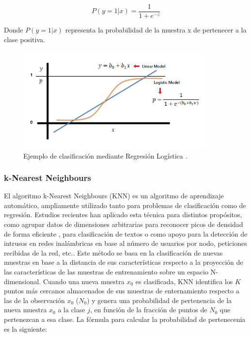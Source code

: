 \documentclass{uathesis-es}
\begin{document}
\[
    P(y = 1 | x) = \frac{1}{1 + e^{-z}}
\]

Donde $P(y = 1 | x)$ representa la probabilidad de la muestra x de pertenecer a la clase positiva.


\begin{figure}[H]
    \centering
    \includegraphics[width=10cm]{Figures/Background/LogReg_1.png}
    \caption{Ejemplo de clasificación mediante Regresión Logística \cite{LR}.}
    \label{GA_inicializacion}
\end{figure}


\subsubsection*{k-Nearest Neighbours}

El algoritmo k-Nearest Neighbours (KNN) es un algoritmo de aprendizaje automático, ampliamente utilizado tanto para problemas de clasificación como de regresión. Estudios recientes han aplicado esta técnica para distintos propósitos, como agrupar datos de dimensiones arbitrarias para reconocer picos de densidad de forma eficiente \cite{chen2020fast}, para clasificación de textos \cite{CHEN2020523} o como apoyo para la detección de intrusos en redes inalámbricas \cite{liu2022enhanced} en base al número de usuarios por nodo, peticiones recibidas de la red, etc.. Este método se basa en la clasificación de nuevas muestras en base a la distancia de sus características respecto a la proyección de las características de las muestras de entrenamiento sobre un espacio N-dimensional. Cuando una nueva muestra $x_0$ es clasificada, KNN identifica los $K$ puntos más cercanos almacenados de sus muestras de enternamiento respecto a las de la observación $x_0$ ($N_0$) y genera una probabilidad de pertenencia de la nueva muestra $x_0$ a la clase $j$, en función de la fracción de puntos de $N_0$ que pertenezcan a esa clase. La fórmula para calcular la probabilidad de pertenecenia es la siguiente:
\end{document}
